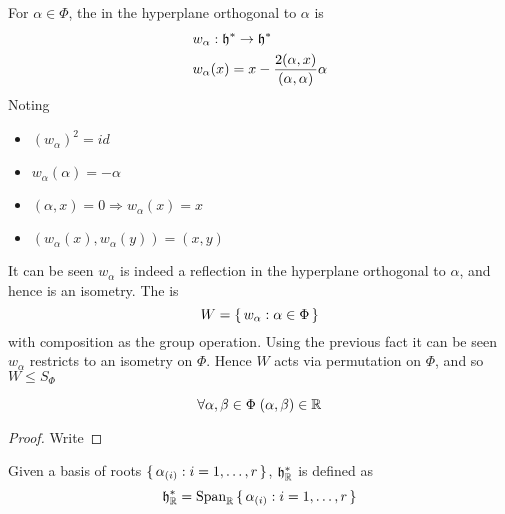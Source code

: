\documentclass{article}
\begin{document}
\begin{definition}
For $\alpha\in\Phi$, the  in the hyperplane orthogonal to $\alpha$ is 
\begin{align*}
    & w_\alpha : \mathfrak{h}^\ast \to \mathfrak{h}^\ast \\
    & w_\alpha (x) = x - \frac{2(\alpha,x)}{(\alpha,\alpha)}\alpha
\end{align*}
Noting 
\begin{itemize}
    \item $(w_\alpha)^2=id$
    \item $w_\alpha (\alpha) = -\alpha$
    \item $(\alpha,x)=0 \Rightarrow w_\alpha (x) = x$
    \item $(w_\alpha(x),w_\alpha(y)) = (x,y)$
\end{itemize}
It can be seen $w_\alpha$ is indeed a reflection in the hyperplane orthogonal to $\alpha$, and hence is an isometry. The  is 
\[
W=\set{  w_\alpha : \alpha\in\Phi  }
\]
with composition as the group operation. Using the previous fact it can be seen $w_\alpha$ restricts to an isometry on $\Phi$. Hence $W$ acts via permutation on $\Phi$, and so $W\leq S_\Phi$
\end{definition}

\begin{lemma}
\[
\forall \alpha, \beta\in\Phi \; (\alpha, \beta)\in\mathbb{R}
\]
\end{lemma}
\begin{proof}
Write 
\end{proof}

\begin{definition}
Given a basis of roots $\set{  \alpha_{(i)} : i=1,\dots,r  }$, $\mathfrak{h}^\ast_{\mathbb{R}}$ is defined as 
\[
\mathfrak{h}^\ast_{\mathbb{R}} = \operatorname{Span}_{\mathbb{R}} \set{  \alpha_{(i)} : i=1,\dots,r  }
\]
\end{definition}
\end{document}

